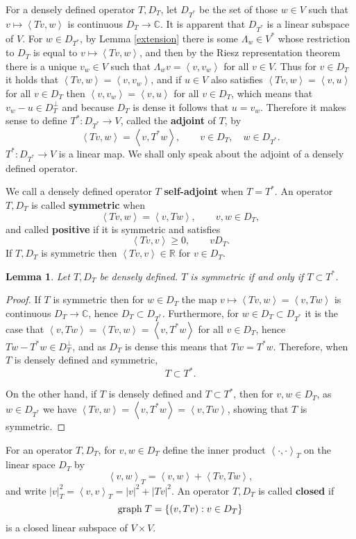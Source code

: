 \documentclass{article}
\newcommand{\inner}[2]{\left\langle #1, #2 \right\rangle}
\newcommand{\graph}{\ensuremath\mathrm{graph}\;}
\newtheorem{lemma}[theorem]{Lemma}
\theoremstyle{definition}
\begin{document}
For a densely defined operator $T,D_T$, let $D_{T^*}$ be the set of those
$w \in V$ such that $v \mapsto \inner{Tv}{w}$ is continuous $D_T \to \mathbb{C}$. It is apparent that
$D_{T^*}$ is a linear subspace of $V$.
For $w \in D_{T^*}$, by Lemma \ref{extension}  there is 
some $\Lambda_w \in V^*$ whose restriction to $D_T$ is equal to 
$v \mapsto \inner{Tv}{w}$, and then by the Riesz representation theorem there is a unique
$v_w \in V$ such that $\Lambda_w v = \inner{v}{v_w}$ for all $v \in V$. Thus for $v \in D_T$ it holds that
$\inner{Tv}{w} = \inner{v}{v_w}$, and  if $u \in V$ also satisfies 
$\inner{Tv}{w} = \inner{v}{u}$ for all $v \in D_T$ then
$\inner{v}{v_w}=\inner{v}{u}$ for all $v \in D_T$, which means that
$v_w-u \in D_T^\perp$ and because $D_T$ is dense it follows
that $u=v_w$.
Therefore it makes sense to define $T^*:D_{T^*} \to V$, called the \textbf{adjoint} of $T$,  by 
\[
\inner{Tv}{w} = \inner{v}{T^*w}, \qquad v \in D_T,\quad w \in D_{T^*}.
\] 
$T^*:D_{T^*} \to V$ is a linear map.
We shall only speak about the adjoint of a densely defined operator.


We call a densely
defined operator $T$ \textbf{self-adjoint} when $T=T^*$.
An operator $T,D_T$ is called \textbf{symmetric} when
\[
\inner{Tv}{w} = \inner{v}{Tw},\qquad v,w \in D_T,
\]
and called \textbf{positive} if it is symmetric and satisfies
\[
\inner{Tv}{v} \geq 0,\qquad v D_T.
\]
If $T,D_T$ is symmetric then $\inner{Tv}{v} \in \mathbb{R}$ for $v \in D_T$.

\begin{lemma}
Let $T,D_T$ be densely defined. $T$ is symmetric if and only if $T \subset T^*$.
\end{lemma}
\begin{proof}
If $T$ is symmetric then
for $w \in D_T$ the map $v \mapsto \inner{Tv}{w}=\inner{v}{Tw}$ is continuous $D_T \to \mathbb{C}$, hence
$D_T \subset D_{T^*}$.
Furthermore, for $w \in D_T \subset D_{T^*}$ it is the case that $\inner{v}{Tw} = \inner{Tv}{w} = \inner{v}{T^*w}$ for all $v \in D_T$,
hence $Tw - T^*w \in D_T^\perp$, and as $D_T$ is dense this means that
$Tw=T^*w$. 
Therefore, when $T$ is densely defined and symmetric,
\[
T \subset T^*.
\]

On the other hand, if $T$ is densely defined and $T \subset T^*$, then for $v,w \in D_T$,
as $w \in D_{T^*}$ we have $\inner{Tv}{w} = \inner{v}{T^*w}=\inner{v}{Tw}$, showing that $T$ is symmetric.
\end{proof}


For an operator $T,D_T$, for $v,w \in D_T$ define the inner product $\inner{\cdot}{\cdot}_T$ on the linear space $D_T$ by
\[
\inner{v}{w}_T = \inner{v}{w} + \inner{Tv}{Tw},
\]
and write $|v|_T^2 = \inner{v}{v}_T = |v|^2+|Tv|^2$.
An operator $T,D_T$ is called \textbf{closed} if
\[
\graph T = \{(v,Tv): v \in D_T\}
\]
is a closed linear subspace of $V \times V$.
\end{document}
